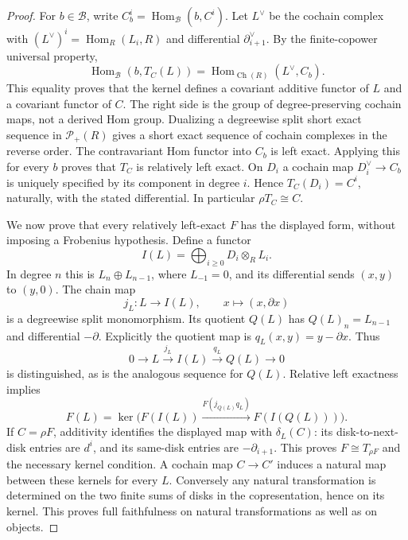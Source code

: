 \begin{proof}
For $b\in\mathcal B$, write $C_b^i=\operatorname{Hom}_{\mathcal B}(b,C^i)$.
Let $L^\vee$ be the cochain complex with
$(L^\vee)^i=\operatorname{Hom}_R(L_i,R)$ and differential
$\partial_{i+1}^{\vee}$.  By the finite-copower universal property,
\[
 \operatorname{Hom}_{\mathcal B}(b,T_C(L))
 =\operatorname{Hom}_{\operatorname{Ch}(R)}(L^\vee,C_b).
 \tag{A2.2a}
\]
This equality proves that the kernel defines a covariant additive
functor of $L$ and a covariant functor of $C$.  The right side is the
group of degree-preserving cochain maps, not a derived Hom group.
Dualizing a degreewise split short exact sequence in $\mathcal P_+(R)$
gives a short exact sequence of cochain complexes in the reverse order.
The contravariant Hom functor into $C_b$ is left exact.  Applying this
for every $b$ proves that $T_C$ is relatively left exact.  On $D_i$ a
cochain map $D_i^\vee\to C_b$ is uniquely specified by its component in
degree $i$.  Hence $T_C(D_i)=C^i$, naturally, with the stated
differential.  In particular $\rho T_C\cong C$.

We now prove that every relatively left-exact $F$ has the displayed
form, without imposing a Frobenius hypothesis.  Define a functor
\[
 I(L)=\bigoplus_{i\geq0}D_i\otimes_RL_i.
\]
In degree $n$ this is $L_n\oplus L_{n-1}$, where $L_{-1}=0$, and its
differential sends $(x,y)$ to $(y,0)$.  The chain map
\[
 j_L:L\longrightarrow I(L),\qquad x\longmapsto(x,\partial x)
\]
is a degreewise split monomorphism.  Its quotient $Q(L)$ has
$Q(L)_n=L_{n-1}$ and differential $-\partial$.  Explicitly the quotient
map is $q_L(x,y)=y-\partial x$.  Thus
\[
 0\longrightarrow L\xrightarrow{j_L}I(L)
      \xrightarrow{q_L}Q(L)\longrightarrow0
\]
is distinguished, as is the analogous sequence for $Q(L)$.
Relative left exactness implies
\[
 F(L)=\ker\bigl(F(I(L))\xrightarrow{F(j_{Q(L)}q_L)}F(I(Q(L)))\bigr).
\]
If $C=\rho F$, additivity identifies the displayed map with
$\delta_L(C)$: its disk-to-next-disk entries are $d^i$, and its
same-disk entries are $-\partial_{i+1}$.  This proves
$F\cong T_{\rho F}$ and the necessary kernel condition.  A cochain map
$C\to C'$ induces a natural map between these kernels for every $L$.
Conversely any natural transformation is determined on the two finite
sums of disks in the copresentation, hence on its kernel.  This proves
full faithfulness on natural transformations as well as on objects.
\end{proof}

